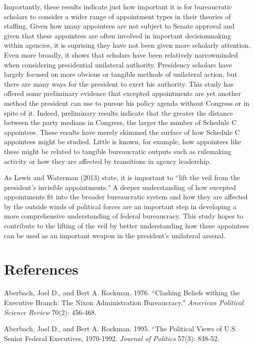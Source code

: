 \documentclass[12pt]{article}
\begin{document}
Importantly, these results indicate just how important it is for bureaucratic scholars to consider a wider range of appointment types in their theories of staffing. Given how many appointees are not subject to Senate approval and given that these appointees are often involved in important decisionmaking within agencies, it is suprising they have not been given more scholarly attention. Even more broadly, it shows that scholars have been relatively narrowminded when considering presidential unilateral authority. Presidency scholars have largely focused on more obvious or tangible methods of unilateral action, but there are many ways for the president to exert his authority. This study has offered some preliminary evidence that excepted appointments are yet another method the president can use to pursue his policy agenda without Congress or in spite of it. Indeed, preliminary results indicate that the greater the distance between the party medians in Congress, the larger the number of Schedule C appointees. These results have merely skimmed the surface of how Schedule C appointees might be studied. Little is known, for example, how appointees like these might be related to tangible bureaucratic outputs such as rulemaking activity or how they are affected by transitions in agency leadership.

As Lewis and Waterman (2013) state, it is important to ``lift the veil from the president's invisible appointments." A deeper understanding of how excepted appointments fit into the broader bureaucratic system and how they are affected by the outside winds of political forces are an important step in developing a more comprehensive understanding of federal bureaucracy. This study hopes to contribute to the lifting of the veil by better understanding how these appointees can be used as an important weapon in the president's unilateral arsenal.



\section*{References}
\noindent \hangindent=0.7cm Aberbach, Joel D.,  and Bert A. Rockman. 1976. ``Clashing Beliefs withing the Executive Branch: The Nixon Administration Bureaucracy." \textit{American Political Science Review} 70(2): 456-468. 

\noindent \hangindent=0.7cm Aberbach, Joel D., and Bert A. Rockman. 1995. ``The Political Views of U.S. Senior Federal Executives, 1970-1992. \textit{Journal of Politics} 57(3): 838-52. 
\end{document}
